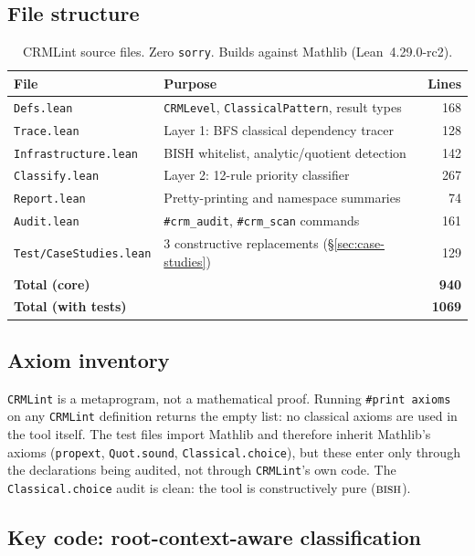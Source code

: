 \documentclass[12pt, a4paper]{article}
\theoremstyle{plain}
\theoremstyle{definition}
\theoremstyle{remark}
\newcommand{\BISH}{\textsc{bish}}
\newcommand{\CRMLint}{\texttt{CRMLint}}
\begin{document}
\subsection{File structure}

\begin{table}[h]
\centering
\begin{tabular}{llr}
\toprule
File & Purpose & Lines \\
\midrule
\texttt{Defs.lean} & \texttt{CRMLevel}, \texttt{ClassicalPattern}, result types & 168 \\
\texttt{Trace.lean} & Layer 1: BFS classical dependency tracer & 128 \\
\texttt{Infrastructure.lean} & BISH whitelist, analytic/quotient detection & 142 \\
\texttt{Classify.lean} & Layer 2: 12-rule priority classifier & 267 \\
\texttt{Report.lean} & Pretty-printing and namespace summaries & 74 \\
\texttt{Audit.lean} & \texttt{\#crm\_audit}, \texttt{\#crm\_scan} commands & 161 \\
\texttt{Test/CaseStudies.lean} & 3 constructive replacements (\S\ref{sec:case-studies}) & 129 \\
\midrule
\textbf{Total (core)} & & \textbf{940} \\
\textbf{Total (with tests)} & & \textbf{1069} \\
\bottomrule
\end{tabular}
\caption{CRMLint source files.  Zero \texttt{sorry}.
Builds against Mathlib (Lean~4.29.0-rc2).}
\label{tab:files}
\end{table}

\subsection{Axiom inventory}

\CRMLint{} is a metaprogram, not a mathematical proof.
Running \texttt{\#print axioms} on any \CRMLint{} definition
returns the empty list: no classical axioms are used in the
tool itself.  The test files import Mathlib and therefore
inherit Mathlib's axioms (\texttt{propext}, \texttt{Quot.sound},
\texttt{Classical.choice}), but these enter only through the
declarations being audited, not through \CRMLint's own code.
The \texttt{Classical.choice} audit is clean: the tool is
constructively pure ($\BISH$).

\subsection{Key code: root-context-aware classification}
\end{document}

